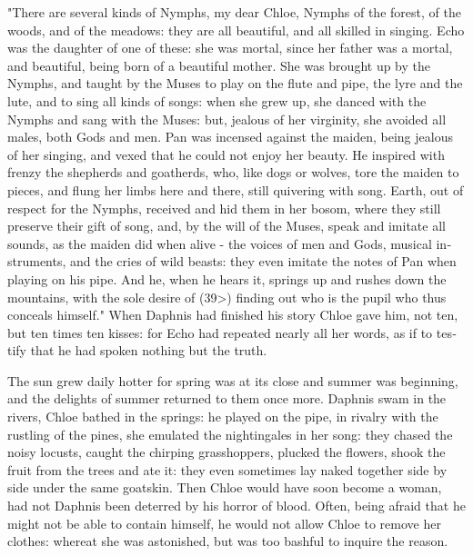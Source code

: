 \documentclass{book}
\begin{document}
\begin{pairs}
\begin{Rightside}
\begin{english}
  "There are several kinds of Nymphs, my dear Chloe, Nymphs of the forest, of the woods, and of the meadows: they are all beautiful, and all skilled in singing.  Echo was the daughter of one of these: she was mortal, since her father was a mortal, and beautiful, being born of a beautiful mother.  She was brought up by the Nymphs, and taught by the Muses to play on the flute and pipe, the lyre and the lute, and to sing all kinds of songs: when she grew up, she danced with the Nymphs and sang with the Muses: but, jealous of her virginity, she avoided all males, both Gods and men.  Pan was incensed against the maiden, being jealous of her singing, and vexed that he could not enjoy her beauty.  He inspired with frenzy the shepherds and goatherds, who, like dogs or wolves, tore the maiden to pieces, and flung her limbs here and there, still quivering with song.  Earth, out of respect for the Nymphs, received and hid them in her bosom, where they still preserve their gift of song, and, by the will of the Muses, speak and imitate all sounds, as the maiden did when alive - the voices of men and Gods, musical instruments, and the cries of wild beasts: they even imitate the notes of Pan when playing on his pipe.  And he, when he hears it, springs up and rushes down the mountains, with the sole desire of (39>) finding out who is the pupil who thus conceals himself."  When Daphnis had finished his story Chloe gave him, not ten, but ten times ten kisses: for Echo had repeated nearly all her words, as if to testify that he had spoken nothing but the truth.
\pend


  The sun grew daily hotter for spring was at its close and summer was beginning, and the delights of summer returned to them once more.  Daphnis swam in the rivers, Chloe bathed in the springs: he played on the pipe, in rivalry with the rustling of the pines, she emulated the nightingales in her song: they chased the noisy locusts, caught the chirping grasshoppers, plucked the flowers, shook the fruit from the trees and ate it: they even sometimes lay naked together side by side under the same goatskin.  Then Chloe would have soon become a woman, had not Daphnis been deterred by his horror of blood.  Often, being afraid that he might not be able to contain himself, he would not allow Chloe to remove her clothes: whereat she was astonished, but was too bashful to inquire the reason.
\pend



\end{english}
\end{Rightside}
\end{pairs}
\end{document}
